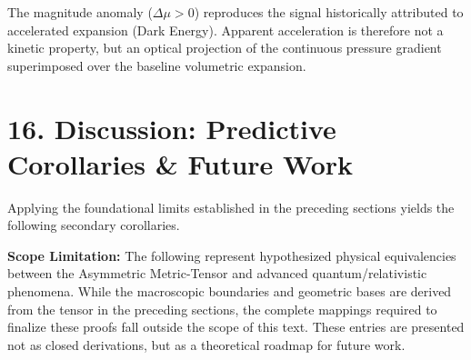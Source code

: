 The magnitude anomaly ($\Delta\mu > 0$) reproduces the signal historically attributed to accelerated expansion (Dark Energy). 
Apparent acceleration is therefore not a kinetic property, but an optical projection of the continuous pressure gradient superimposed over the baseline volumetric expansion.

\section*{16. Discussion: Predictive Corollaries \& Future Work}
Applying the foundational limits established in the preceding sections yields the following secondary corollaries. 

\textbf{Scope Limitation:} The following represent hypothesized physical equivalencies between the Asymmetric Metric-Tensor and advanced quantum/relativistic phenomena. While the macroscopic boundaries and geometric bases are derived from the tensor in the preceding sections, the complete mappings required to finalize these proofs fall outside the scope of this text. These entries are presented not as closed derivations, but as a theoretical roadmap for future work. 



